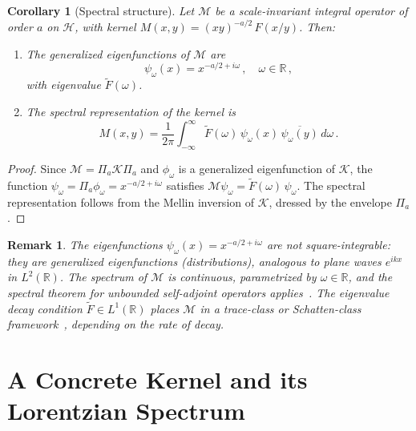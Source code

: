 \documentclass[12pt]{article}
\newtheorem{corollary}[theorem]{Corollary}
\newtheorem{remark}[theorem]{Remark}
\begin{document}
\begin{corollary}[Spectral structure]\label{cor:spectral}
Let $\mathcal{M}$ be a scale-invariant integral operator of order $a$ on $\mathcal{H}$, with kernel $M(x,y) = (xy)^{-a/2}\, F(x/y)$. Then:
\begin{enumerate}[label=\emph{(\roman*)},nosep]
\item The generalized eigenfunctions of $\mathcal{M}$ are
\begin{equation}\label{eq:eigenfunctions}
\psi_\omega(x) = x^{-a/2 + i\omega}\,, \quad \omega \in \mathbb{R}\,,
\end{equation}
with eigenvalue $\widetilde{F}(\omega)$.
\item The spectral representation of the kernel is
\begin{equation}\label{eq:spectralrep}
M(x,y) = \frac{1}{2\pi}\int_{-\infty}^\infty \widetilde{F}(\omega)\, \psi_\omega(x)\, \overline{\psi_\omega(y)}\, d\omega\,.
\end{equation}
\end{enumerate}
\end{corollary}

\begin{proof}
Since $\mathcal{M} = \Pi_a \mathcal{K} \Pi_a$ and $\phi_\omega$ is a generalized eigenfunction of $\mathcal{K}$, the function $\psi_\omega = \Pi_a \phi_\omega = x^{-a/2+i\omega}$ satisfies $\mathcal{M}\psi_\omega = \widetilde{F}(\omega)\,\psi_\omega$. The spectral representation follows from the Mellin inversion of $\mathcal{K}$, dressed by the envelope $\Pi_a$.
\end{proof}

\begin{remark}\label{rem:generalized}
The eigenfunctions $\psi_\omega(x) = x^{-a/2+i\omega}$ are \emph{not} square-integrable: they are generalized eigenfunctions (distributions), analogous to plane waves $e^{ikx}$ in $L^2(\mathbb{R})$. The spectrum of $\mathcal{M}$ is continuous, parametrized by $\omega \in \mathbb{R}$, and the spectral theorem for unbounded self-adjoint operators applies~\cite{ReedSimon1978,Titchmarsh1986}. The eigenvalue decay condition $\widetilde{F} \in L^1(\mathbb{R})$ places $\mathcal{M}$ in a trace-class or Schatten-class framework~\cite{Simon2005}, depending on the rate of decay.
\end{remark}


\section{A Concrete Kernel and its Lorentzian Spectrum}\label{sec:example}
\end{document}
